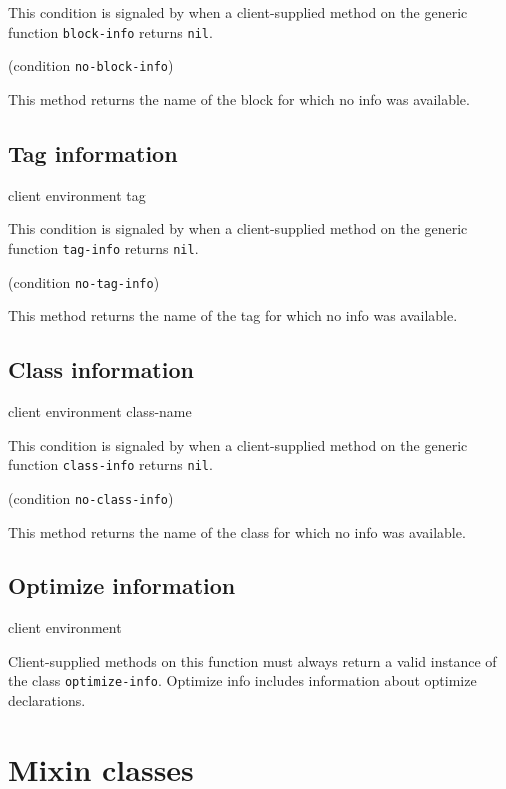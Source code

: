 
This condition is signaled by \sysname{} when a client-supplied method
on the generic function \texttt{block-info} returns \texttt{nil}.

 {(condition {\tt no-block-info})}

This method returns the name of the block for which no info was
available.

\subsection{Tag information}

 {client environment tag}


This condition is signaled by \sysname{} when a client-supplied method
on the generic function \texttt{tag-info} returns \texttt{nil}.

 {(condition {\tt no-tag-info})}

This method returns the name of the tag for which no info was
available.

\subsection{Class information}

 {client environment class-name}


This condition is signaled by \sysname{} when a client-supplied method
on the generic function \texttt{class-info} returns \texttt{nil}.

 {(condition {\tt no-class-info})}

This method returns the name of the class for which no info was
available.

\subsection{Optimize information}

 {client environment}

Client-supplied methods on this function must always return a valid
instance of the class \texttt{optimize-info}. Optimize info includes
information about optimize declarations.


\section{Mixin classes}

